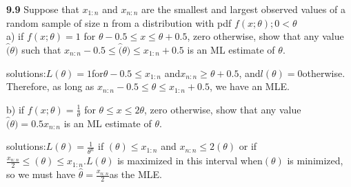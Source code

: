 \textbf{9.9} Suppose that $x_{1:n}$ and $x_{n:n}$ are the smallest and largest observed values of a random sample of size n from a distribution with pdf $f(x;\theta); 0<\theta$\\

a) if $f(x;\theta)=1$ for $\theta-0.5 \le x \le \theta +0.5$, zero otherwise, show that any value $\hat(\theta)$ such that $x_{n:n}-0.5 \le \hat(\theta) \le x_{1:n}+0.5$ is an ML estimate of $\theta$.


solutions:$L(\theta )=1 $for$\theta-0.5\le { x }_{ 1:n }$ and$ { x }_{ n:n }\ge \theta +0.5$, and$ l(\theta) = 0 $otherwise. Therefore, as long as $ {x}_{n:n}-0.5 \le \hat { \theta  } \le {x}_{1:n}+0.5$, we have an MLE.



b) if $f(x;\theta)=\frac{1}{\theta}$ for $\theta \le x \le 2\theta$, zero otherwise, show that any value $\hat(\theta)=0.5x_{n:n}$ is an ML estimate of $\theta$.

solutions:$ L(\theta)=\frac { 1 }{ { \theta  }^{ n } }$ if $(\theta) \le {x}_{1:n}$ and ${x}_{n:n}\le 2(\theta) $ or if$ \frac { { x }_{ n:n } }{ 2 } \le (\theta) \le {x}_{1:n}. L(\theta)$ is maximized in this interval when$ (\theta)$ is minimized, so we must have $\hat { \theta  } = \frac { { x }_{ n:n } }{ 2 } $as the MLE. \\






